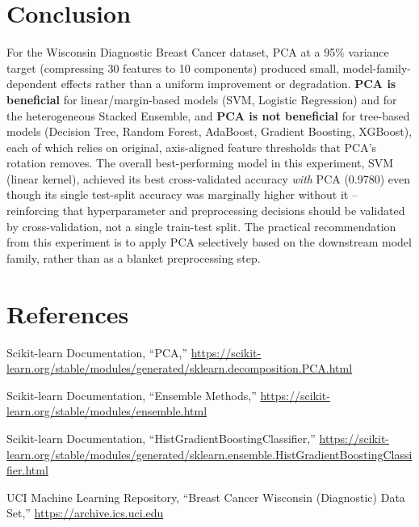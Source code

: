\documentclass[12pt,a4paper]{article}
\begin{document}
\section{Conclusion}
For the Wisconsin Diagnostic Breast Cancer dataset, PCA at a 95\% variance target (compressing
30 features to 10 components) produced small, model-family-dependent effects rather than a
uniform improvement or degradation. \textbf{PCA is beneficial} for linear/margin-based models
(SVM, Logistic Regression) and for the heterogeneous Stacked Ensemble, and \textbf{PCA is not
beneficial} for tree-based models (Decision Tree, Random Forest, AdaBoost, Gradient Boosting,
XGBoost), each of which relies on original, axis-aligned feature thresholds that PCA's
rotation removes. The overall best-performing model in this experiment, SVM (linear kernel),
achieved its best cross-validated accuracy \emph{with} PCA (0.9780) even though its single
test-split accuracy was marginally higher without it -- reinforcing that hyperparameter and
preprocessing decisions should be validated by cross-validation, not a single train-test
split. The practical recommendation from this experiment is to apply PCA selectively based on
the downstream model family, rather than as a blanket preprocessing step.

\section{References}
\begin{enumerate}[label={[\arabic*]}]
\item Scikit-learn Documentation, ``PCA,'' \url{https://scikit-learn.org/stable/modules/generated/sklearn.decomposition.PCA.html}
\item Scikit-learn Documentation, ``Ensemble Methods,'' \url{https://scikit-learn.org/stable/modules/ensemble.html}
\item Scikit-learn Documentation, ``HistGradientBoostingClassifier,'' \url{https://scikit-learn.org/stable/modules/generated/sklearn.ensemble.HistGradientBoostingClassifier.html}
\item UCI Machine Learning Repository, ``Breast Cancer Wisconsin (Diagnostic) Data Set,'' \url{https://archive.ics.uci.edu}
\end{enumerate}
\end{document}
